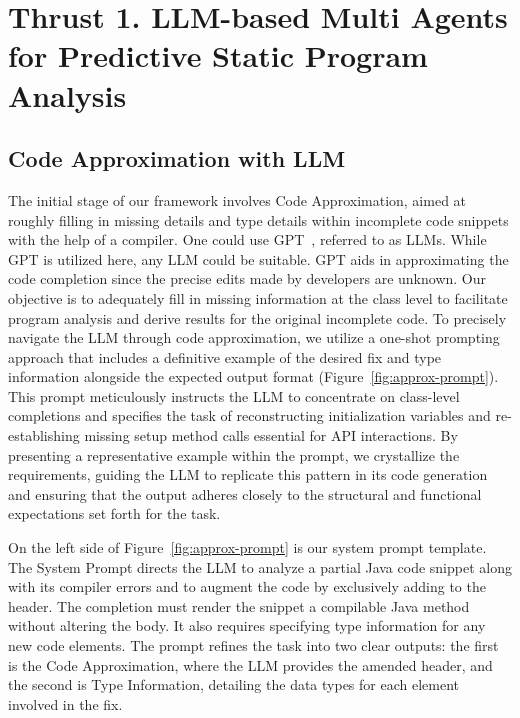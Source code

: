 \section{Thrust 1. LLM-based Multi Agents for Predictive Static Program Analysis}
\label{sec:thrust1}


\subsection{Code Approximation with LLM}



% 

The initial stage of our framework involves Code Approximation, aimed at roughly filling in missing details and type details within incomplete code snippets with the help of a compiler. One could use GPT~\cite{ChatGPT}, referred to as LLMs. While GPT is utilized here, any LLM could be suitable. GPT aids in approximating the code completion since the precise edits made by developers are unknown. Our objective is to adequately fill in missing information at the class level to facilitate program analysis and derive results for the original incomplete code.
%
To precisely navigate the LLM through code approximation, we utilize a one-shot prompting approach that includes a definitive example of the desired fix and type information alongside the expected output format (Figure~\ref{fig:approx-prompt}). This prompt meticulously instructs the LLM to concentrate on class-level completions and specifies the task of reconstructing initialization variables and re-establishing missing setup method calls essential for API interactions. By presenting a representative example within the prompt, we crystallize the requirements, guiding the LLM to replicate this pattern in its code generation and ensuring that the output adheres closely to the structural and functional expectations set forth for the task.

On the left side of Figure~\ref{fig:approx-prompt} is our system prompt template. The System Prompt directs the LLM to analyze a partial Java code snippet along with its compiler errors and to augment the code by exclusively adding to the header. The completion must render the snippet a compilable Java method without altering the body. It also requires specifying type information for any new code elements. The prompt refines the task into two clear outputs: the first is the Code Approximation, where the LLM provides the amended header, and the second is Type Information, detailing the data types for each element involved in the fix.

